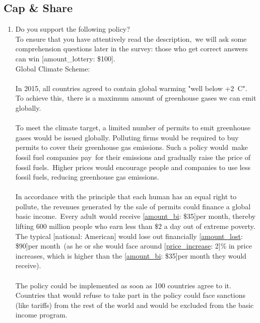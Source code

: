  \subsection*{Cap \& Share} 
 \begin{enumerate}[resume] 
\item  \label{q:gcs_support} Do you support the following policy?\\
To ensure that you have attentively read the description,~we will ask some comprehension questions later in the survey: those who get correct answers can win [amount\_lottery: \$100].
~\\
Global Climate Scheme:~\\\\
In 2015, all countries agreed to contain global warming "well below +2~\textdegree{}C". To achieve this,~there is a maximum amount of greenhouse gases we can emit globally.~\\\\
To meet the climate target, a limited number of permits to emit greenhouse gases would be issued globally. Polluting firms would be required to buy permits to cover their greenhouse gas emissions. Such a policy would~make fossil fuel companies pay~for their emissions and gradually raise the price of fossil fuels.~Higher prices would encourage people and companies to use less fossil fuels, reducing greenhouse gas emissions.\\\\
In accordance with the principle that each human has an equal right to pollute, the revenues generated by the sale of permits could finance a global basic income.~Every adult would receive [\hyperlink{tab_features}{amount\_bi}: \$35]per month, thereby lifting 600 million people who earn less than \$2 a day out of extreme poverty.\\
The typical [national: American] would lose out financially [\hyperlink{tab_features}{amount\_lost}: \$90]per month~(as he or she would face around [\hyperlink{tab_features}{price\_increase}: 2]\% in price increases, which is higher than the [\hyperlink{tab_features}{amount\_bi}: \$35]per month they would receive).\\\\
The policy could be implemented as soon as 100 countries agree to it. Countries that would refuse to take part in the policy could face sanctions (like tariffs) from the rest of the world and would be excluded from the basic income program.\\\\

\end{enumerate}
